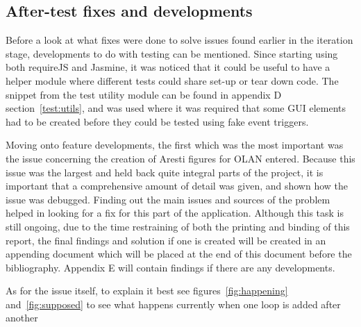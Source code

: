 \subsection{After-test fixes and developments}
Before a look at what fixes were done to solve issues found earlier in the iteration stage, developments to do with testing can be mentioned. Since starting using both requireJS and Jasmine, it was noticed that it could be useful to have a helper module where different tests could share set-up or tear down code. The snippet from the test utility module can be found in appendix D section~\ref{test:utils}, and was used where it was required that some GUI elements had to be created before they could be tested using fake event triggers.

Moving onto feature developments, the first which was the most important was the issue concerning the creation of Aresti figures for OLAN entered. Because this issue was the largest and held back quite integral parts of the project, it is important that a comprehensive amount of detail was given, and shown how the issue was debugged. Finding out the main issues and sources of the problem helped in looking for a fix for this part of the application. Although this task is still ongoing, due to the time restraining of both the printing and binding of this report, the final findings and solution if one is created will be created in an appending document which will be placed at the end of this document before the bibliography. Appendix E will contain findings if there are any developments. 

As for the issue itself, to explain it best see figures~\ref{fig:happening} and~\ref{fig:supposed} to see what happens currently when one loop is added after another 


